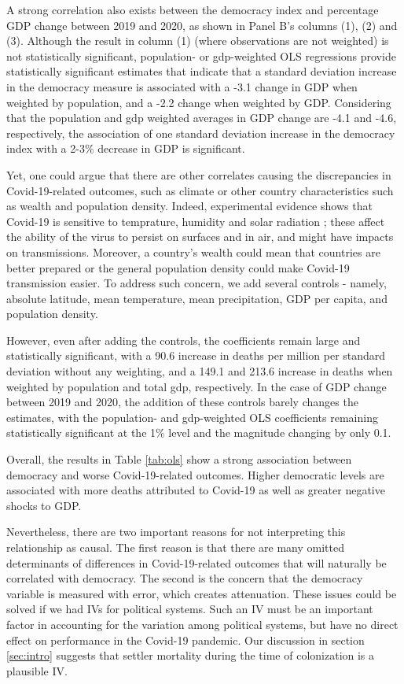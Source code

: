 A strong correlation also exists between the democracy index and percentage GDP change between 2019 and 2020, as shown in Panel B's columns (1), (2) and (3). Although the result in column (1) (where observations are not weighted) is not statistically significant, population- or gdp-weighted OLS regressions provide statistically significant estimates that indicate that a standard deviation increase in the democracy measure is associated with a -3.1 change in GDP when weighted by population, and a -2.2 change when weighted by GDP. Considering that the population and gdp weighted averages in GDP change are -4.1 and -4.6, respectively, the association of one standard deviation increase in the democracy index with a 2-3\% decrease in GDP is significant. 
    
Yet, one could argue that there are other correlates causing the discrepancies in Covid-19-related outcomes, such as climate or other country characteristics such as wealth and population density. Indeed, experimental evidence shows that Covid-19 is sensitive to temprature, humidity and solar radiation \parencite{chin}; these affect the ability of the virus to persist on surfaces and in air, and might have impacts on transmissions. Moreover, a country's wealth could mean that countries are better prepared or the general population density could make Covid-19 transmission easier. To address such concern, we add several controls - namely, absolute latitude, mean temperature, mean precipitation, GDP per capita, and population density. 

However, even after adding the controls, the coefficients remain large and statistically significant, with a 90.6 increase in deaths per million per standard deviation without any weighting, and a 149.1 and 213.6 increase in deaths when weighted by population and total gdp, respectively. In the case of GDP change between 2019 and 2020, the addition of these controls barely changes the estimates, with the population- and gdp-weighted OLS coefficients remaining statistically significant at the 1\% level and the magnitude changing by only 0.1. 

Overall, the results in Table \ref{tab:ols} show a strong association between democracy and worse Covid-19-related outcomes. Higher democratic levels are associated with more deaths attributed to Covid-19 as well as greater negative shocks to GDP.

Nevertheless, there are two important reasons for not interpreting this relationship as causal. The first reason is that there are many omitted determinants of differences in Covid-19-related outcomes that will naturally be correlated with democracy. The second is the concern that the democracy variable is measured with error, which creates attenuation. These issues could be solved if we had IVs for political systems. Such an IV must be an important factor in accounting for the variation among political systems, but have no direct effect on performance in the Covid-19 pandemic. Our discussion in section \ref{sec:intro} suggests that settler mortality during the time of colonization is a plausible IV. 
